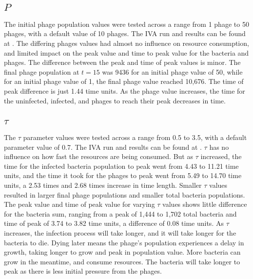 \subsection{$P$}
The initial phage population values were tested across a range from 1 phage to 50 phages, with a default value of 10 phages. 
The IVA run and results can be found at . 
The differing phages values had almost no influence on resource consumption, and limited impact on the peak value and time to peak value for the bacteria and phages. 
The difference between the peak and time of peak values is minor. 
The final phage population at $t=15$ was 9436 for an initial phage value of 50, while for an initial phage value of 1, the final phage value reached 10,676. 
The time of peak difference is just 1.44 time units. 
As the phage value increases, the time for the uninfected, infected, and phages to reach their peak decreases in time. 

\subsection{$\tau$}
The $\tau$ parameter values were tested across a range from 0.5 to 3.5, with a default parameter value of 0.7. 
The IVA run and results can be found at . 
$\tau$ has no influence on how fast the resources are being consumed. 
But as $\tau$ increased, the time for the infected bacteria population to peak went from 4.43 to 11.21 time units, and the time it took for the phages to peak went from 5.49 to 14.70 time units, a 2.53 times and 2.68 times increase in time length. 
Smaller $\tau$ values resulted in larger final phage populations and smaller total bacteria populations. 
The peak value and time of peak value for varying $\tau$ values shows little difference for the bacteria sum, ranging from a peak of 1,444 to 1,702 total bacteria and time of peak of 3.74 to 3.82 time units, a difference of 0.08 time units. 
As $\tau$ increases, the infection process will take longer, and it will take longer for the bacteria to die. 
Dying later means the phage's population experiences a delay in growth, taking longer to grow and peak in population value. 
More bacteria can grow in the meantime, and consume resources. 
The bacteria will take longer to peak as there is less initial pressure from the phages. 

